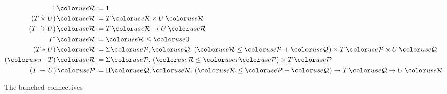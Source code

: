 \begin{figure}
  \begin{align*}
    \dot1\,\grR &\coloneqq 1 \\
    (T \dottimes U)\,\grR &\coloneqq T\,\grR \times U\,\grR \\
    (T \dotto U)\,\grR &\coloneqq T\,\grR \to U\,\grR \\
    I^*\,\grR &\coloneqq \grR \leq \gr0 \\
    (T \sep U)\,\grR &\coloneqq \Sigma \grP,\grQ.~\plr{\grR \leq \grP + \grQ}
                       \times T\,\grP \times U\,\grQ \\
    (\gr r \cdot T)\,\grR &\coloneqq \Sigma \grP.~\plr{\grR \leq \gr r\grP}
                       \times T\,\grP \\
    (T \wand U)\,\grP &\coloneqq \Pi \grQ,\grR.~\plr{\grR \leq \grP + \grQ}
                       \to T\,\grQ \to U\,\grR
  \end{align*}
  \caption{The bunched connectives}
  \label{fig:bunched}
\end{figure}

